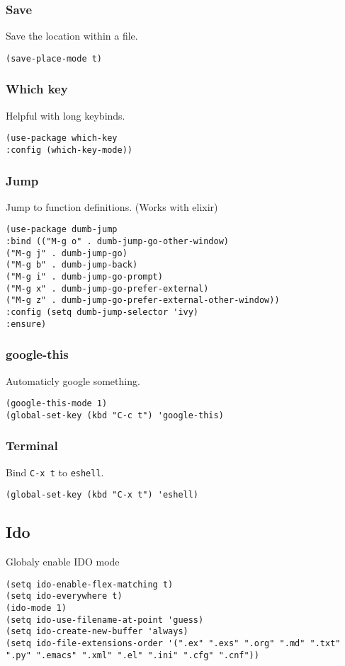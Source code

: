 \documentclass[11pt]{article}
\begin{document}
\subsubsection*{Save}
\label{sec:org3a6ac94}
Save the location within a file.
\begin{verbatim}
(save-place-mode t)
\end{verbatim}
\subsubsection*{Which key}
\label{sec:org7201a9e}
Helpful with long keybinds.
\begin{verbatim}
(use-package which-key
:config (which-key-mode))
\end{verbatim}
\subsubsection*{Jump}
\label{sec:org24a5a58}
Jump to function definitions.
(Works with elixir)
\begin{verbatim}
(use-package dumb-jump
:bind (("M-g o" . dumb-jump-go-other-window)
("M-g j" . dumb-jump-go)
("M-g b" . dumb-jump-back)
("M-g i" . dumb-jump-go-prompt)
("M-g x" . dumb-jump-go-prefer-external)
("M-g z" . dumb-jump-go-prefer-external-other-window))
:config (setq dumb-jump-selector 'ivy)
:ensure)
\end{verbatim}
\subsubsection*{google-this}
\label{sec:orgecbe185}
Automaticly google something.
\begin{verbatim}
(google-this-mode 1)
(global-set-key (kbd "C-c t") 'google-this)
\end{verbatim}
\subsubsection*{Terminal}
\label{sec:org7729baf}
Bind \texttt{C-x t} to \texttt{eshell}.
\begin{verbatim}
(global-set-key (kbd "C-x t") 'eshell)
\end{verbatim}
\subsection*{Ido}
\label{sec:org87e741d}
Globaly enable IDO mode
\begin{verbatim}
(setq ido-enable-flex-matching t)
(setq ido-everywhere t)
(ido-mode 1)
(setq ido-use-filename-at-point 'guess)
(setq ido-create-new-buffer 'always)
(setq ido-file-extensions-order '(".ex" ".exs" ".org" ".md" ".txt" ".py" ".emacs" ".xml" ".el" ".ini" ".cfg" ".cnf"))
\end{verbatim}
\end{document}
